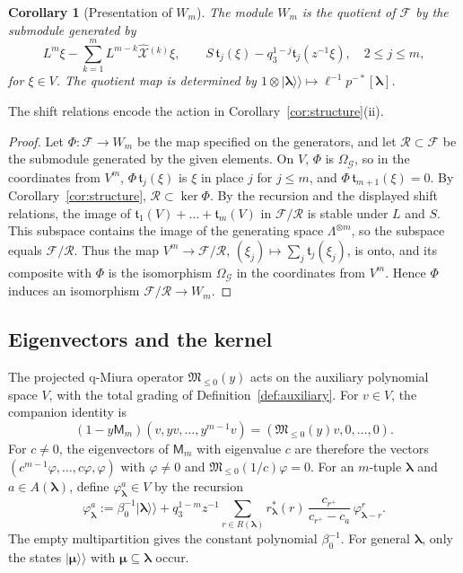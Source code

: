 \documentclass[11pt]{amsart}
\newtheorem{corollary}[theorem]{Corollary}
\theoremstyle{definition}
\theoremstyle{remark}
\newcommand{\betaz}{\beta_0}                     %
\newcommand{\La}{\Lambda}                        %
\newcommand{\bl}{{\boldsymbol{\lambda}}}         %
\newcommand{\bmu}{{\boldsymbol{\mu}}}
\newcommand{\Add}[1]{A(#1)}                      %
\newcommand{\Rem}[1]{R(#1)}                      %
\newcommand{\cores}[2]{r^*_{#1}(#2)}             %
\newcommand{\ceig}[1]{c_{#1}}                    %
\newcommand{\bplus}[1]{{#1}^{+}}                 %
\newcommand{\Wsp}[1]{W_{#1}}                     %
\newcommand{\kket}[1]{\lvert #1\rangle\!\rangle} %
\newcommand{\fix}[1]{[#1]}                       %
\newcommand{\taut}{\ell}                         %
\newcommand{\pulm}{p^{-*}}                       %
\newcommand{\Shift}{S}                           %
\newcommand{\OmapG}{\Omega_{\mathcal G}}         %
\newcommand{\Llet}{L}                            %
\newcommand{\Trunc}[1]{\mathfrak t_{#1}}         %
\newcommand{\Xhat}[1]{\widehat{\mathcal X}{}^{(#1)}}   %
\newcommand{\MM}{\mathsf M}
\newcommand{\Miura}[1]{\MM_{#1}}                 %
\newcommand{\Miuraop}{\mathfrak M}               %
\newcommand{\Miuraproj}{\Miuraop_{\leq0}}         %
\newcommand{\Meig}[2]{\varphi_{#1}^{#2}}         %
\begin{document}
\begin{samepage}
\begin{corollary}[Presentation of \(\Wsp{m}\)]\label{cor:presentation}
The module \(\Wsp{m}\) is the quotient of \(\mathcal F\) by the submodule generated by
\[
 \Llet^m\xi-\sum_{k=1}^m\Llet^{m-k}\Xhat{k}\xi,\qquad
 \Shift\,\Trunc{j}(\xi)-q_3^{1-j}\Trunc{j}(z^{-1}\xi),\quad2\leq j\leq m,
\]
for \(\xi\in V\). The quotient map is determined by
\(1\otimes\kket{\bl}\mapsto\taut^{-1}\pulm\fix{\bl}\).
\end{corollary}
\end{samepage}

The shift relations encode the action in Corollary~\ref{cor:structure}(ii).

\begin{proof}
Let \(\Phi\colon\mathcal F\to\Wsp{m}\) be the map specified on the generators, and
let \(\mathcal R\subset\mathcal F\) be the submodule generated by the given elements. On \(V\), \(\Phi\) is
\(\OmapG\), so in the coordinates from \(V^m\), \(\Phi\,\Trunc{j}(\xi)\) is \(\xi\) in place \(j\) for
\(j\leq m\), and \(\Phi\,\Trunc{m+1}(\xi)=0\). By Corollary~\ref{cor:structure}, \(\mathcal R\subset\ker\Phi\).
By the recursion and the displayed shift relations, the image of
\(\Trunc{1}(V)+\dots+\Trunc{m}(V)\) in \(\mathcal F/\mathcal R\) is stable under \(\Llet\) and \(\Shift\).
This subspace contains the image of the generating space \(\La^{\otimes m}\),
so the subspace equals \(\mathcal F/\mathcal R\). Thus the map
\(V^m\to\mathcal F/\mathcal R\), \((\xi_j)\mapsto\sum_j\Trunc{j}(\xi_j)\), is onto, and its composite with \(\Phi\)
is the isomorphism \(\OmapG\) in the coordinates from \(V^m\). Hence \(\Phi\) induces an isomorphism
\(\mathcal F/\mathcal R\to\Wsp{m}\).
\end{proof}

\subsection{Eigenvectors and the kernel}\label{sec:eigen}

The projected q-Miura operator \(\Miuraproj(y)\) acts on the auxiliary
polynomial space \(V\), with the total grading of
Definition~\ref{def:auxiliary}. For \(v\in V\), the companion identity is
\begin{equation}\label{eq:block}
 (1-y\Miura{m})(v,yv,\dots,y^{m-1}v)=(\Miuraproj(y)v,0,\dots,0).
\end{equation}
For \(c\neq0\), the eigenvectors of \(\Miura{m}\) with eigenvalue \(c\) are
therefore the vectors \((c^{m-1}\varphi,\dots,c\varphi,\varphi)\) with
\(\varphi\neq0\) and \(\Miuraproj(1/c)\varphi=0\).
For an \(m\)-tuple \(\bl\) and \(a\in\Add{\bl}\), define
\(\Meig{\bl}{a}\in V\) by the recursion
\begin{equation}\label{eq:phicorners}
 \Meig{\bl}{a}:=\betaz^{-1}\kket{\bl}
 +q_3^{1-m}z^{-1}\sum_{r\in\Rem{\bl}}\cores{\bl}{r}\,
 \frac{\ceig{\bplus{r}}}{\ceig{\bplus{r}}-\ceig{a}}\,\Meig{\bl-r}{r}.
\end{equation}
The empty multipartition gives the constant polynomial \(\betaz^{-1}\).
For general \(\bl\), only the states \(\kket{\bmu}\) with \(\bmu\subseteq\bl\) occur.
\end{document}
